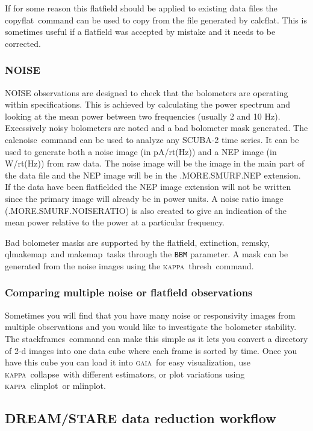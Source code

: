 \documentclass[twoside,11pt]{article}
\newcommand{\xref}[3]{#1}
\newcommand{\xlabel}[1]{}
\renewcommand{\_}{\texttt{\symbol{95}}}
\newcommand{\GAIA}{\textsc{gaia}}
\newcommand{\KAPPA}{\textsc{kappa}}
\newcommand{\task}[1]{\textsf{#1}}
\newcommand{\calcflat}{\xref{\task{calcflat}}{sun258}{CALCFLAT}}
\newcommand{\calcnoise}{\xref{\task{calcnoise}}{sun258}{CALCNOISE}}
\newcommand{\copyflat}{\xref{\task{copyflat}}{sun258}{COPYFLAT}}
\newcommand{\qlmakemap}{\xref{\task{qlmakemap}}{sun258}{QLMAKEMAP}}
\newcommand{\stackframes}{\xref{\task{stackframes}}{sun258}{STACKFRAMES}}
\newcommand{\extinction}{\xref{\task{extinction}}{sun258}{EXTINCTION}}
\newcommand{\flatfield}{\xref{\task{flatfield}}{sun258}{FLATFIELD}}
\newcommand{\makemap}{\xref{\task{makemap}}{sun258}{MAKEMAP}}
\newcommand{\remsky}{\xref{\task{remsky}}{sun258}{REMSKY}}
\newcommand{\clinplot}{\xref{\task{clinplot}}{sun95}{CLINPLOT}}
\newcommand{\mlinplot}{\xref{\task{mlinplot}}{sun95}{MLINPLOT}}
\newcommand{\collapse}{\xref{\task{collapse}}{sun95}{COLLAPSE}}
\newcommand{\thresh}{\xref{\task{thresh}}{sun95}{THRESH}}
\newcommand{\aparam}[1]{\texttt{#1}}     %
\begin{document}
If for some reason this flatfield should be applied to existing data
files the \copyflat\ command can be used to copy from the file
generated by \calcflat. This is sometimes useful if a flatfield was
accepted by mistake and it needs to be corrected.

\subsubsection{NOISE}

NOISE observations are designed to check that the bolometers are
operating within specifications. This is achieved by calculating the
power spectrum and looking at the mean power between two frequencies
(usually 2 and 10 Hz). Excessively noisy bolometers are noted and a bad
bolometer mask generated.  The \calcnoise\ command can be used to
analyze any SCUBA-2 time series. It can be used to generate both a
noise image (in pA/rt(Hz)) and a NEP image (in W/rt(Hz)) from raw
data. The noise image will be the image in the main part of the data
file and the NEP image will be in the .MORE.SMURF.NEP extension. If
the data have been flatfielded the NEP image extension will not be
written since the primary image will already be in power units. A
noise ratio image (.MORE.SMURF.NOISERATIO) is also created to give an
indication of the mean power relative to the power at a particular frequency.

Bad bolometer masks are supported by the \flatfield, \extinction,
\remsky, \qlmakemap\ and \makemap\ tasks through the \aparam{BBM}
parameter. A mask can be generated from the noise images using the
\KAPPA\ \thresh\ command.

\subsubsection{Comparing multiple noise or flatfield observations}

Sometimes you will find that you have many noise or responsivity
images from multiple observations and you would like to investigate the
bolometer stability. The \stackframes\ command can make this simple as
it lets you convert a directory of 2-d images into one data cube where
each frame is sorted by time. Once you have this cube you can load it
into \GAIA\ for easy visualization, use \KAPPA\ \collapse\ with
different estimators, or plot variations using \KAPPA\ \clinplot\ or \mlinplot.

\subsection{\xlabel{dsworkflow}DREAM/STARE data reduction workflow\label{se:dsworkflow}}
\end{document}
